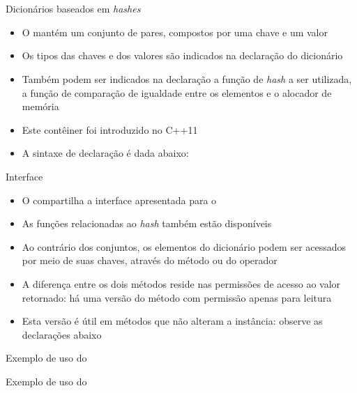 \section{}

\begin{frame}[fragile]{Dicionários baseados em {\it hashes}} 

    \begin{itemize}
        \item O  mantém um conjunto de pares, compostos por 
            uma chave e um valor

        \item Os tipos  das chaves e dos valores são indicados na declaração do 
            dicionário

        \item Também podem ser indicados na declaração a função de \textit{hash} a ser utilizada,
            a função de comparação de igualdade entre os elementos e o alocador de memória

        \item Este contêiner foi introduzido no C++11
    
        \item A sintaxe de declaração é dada abaixo:

    \end{itemize}

\end{frame}

\begin{frame}[fragile]{Interface}

    \begin{itemize}
        \item O  compartilha a interface apresentada
            para o 

        \item As funções relacionadas ao \textit{hash} também estão disponíveis

        \item Ao contrário dos conjuntos, os elementos do dicionário podem ser acessados
            por meio de suas chaves, através do método  ou do operador

        \item A diferença entre os dois métodos reside nas permissões de acesso ao valor
            retornado: há uma versão do método  com permissão apenas para leitura

        \item Esta versão é útil em métodos que não alteram a instância: observe as declarações
            abaixo

    \end{itemize}

\end{frame}

\begin{frame}[fragile]{Exemplo de uso do }
\end{frame}

\begin{frame}[fragile]{Exemplo de uso do }
\end{frame}


